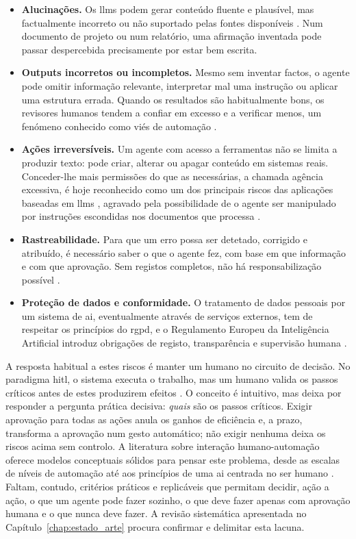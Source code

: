 \begin{itemize}
  \item \textbf{Alucinações.} Os \glspl{llm} podem gerar conteúdo fluente e plausível, mas factualmente incorreto ou não suportado pelas fontes disponíveis \parencite{ji2023survey,huang2025survey}. Num documento de projeto ou num relatório, uma afirmação inventada pode passar despercebida precisamente por estar bem escrita.
  \item \textbf{Outputs incorretos ou incompletos.} Mesmo sem inventar factos, o agente pode omitir informação relevante, interpretar mal uma instrução ou aplicar uma estrutura errada. Quando os resultados são habitualmente bons, os revisores humanos tendem a confiar em excesso e a verificar menos, um fenómeno conhecido como viés de automação \parencite{parasuraman2010complacency,goddard2012automation}.
  \item \textbf{Ações irreversíveis.} Um agente com acesso a ferramentas não se limita a produzir texto: pode criar, alterar ou apagar conteúdo em sistemas reais. Conceder-lhe mais permissões do que as necessárias, a chamada agência excessiva, é hoje reconhecido como um dos principais riscos das aplicações baseadas em \glspl{llm} \parencite{owasp2025top10}, agravado pela possibilidade de o agente ser manipulado por instruções escondidas nos documentos que processa \parencite{greshake2023not}.
  \item \textbf{Rastreabilidade.} Para que um erro possa ser detetado, corrigido e atribuído, é necessário saber o que o agente fez, com base em que informação e com que aprovação. Sem registos completos, não há responsabilização possível \parencite{raji2020closing}.
  \item \textbf{Proteção de dados e conformidade.} O tratamento de dados pessoais por um sistema de \gls{ai}, eventualmente através de serviços externos, tem de respeitar os princípios do \gls{rgpd}, e o Regulamento Europeu da Inteligência Artificial introduz obrigações de registo, transparência e supervisão humana \parencite{rgpd2016,aiact2024}.
\end{itemize}

A resposta habitual a estes riscos é manter um humano no circuito de decisão. No paradigma \gls{hitl}, o sistema executa o trabalho, mas um humano valida os passos críticos antes de estes produzirem efeitos \parencite{mosqueira2023human,hleg2019ethics}. O conceito é intuitivo, mas deixa por responder a pergunta prática decisiva: \emph{quais} são os passos críticos. Exigir aprovação para todas as ações anula os ganhos de eficiência e, a prazo, transforma a aprovação num gesto automático; não exigir nenhuma deixa os riscos acima sem controlo. A literatura sobre interação humano-automação oferece modelos conceptuais sólidos para pensar este problema, desde as escalas de níveis de automação \parencite{sheridan1978human,parasuraman2000model} até aos princípios de uma \gls{ai} centrada no ser humano \parencite{shneiderman2020human}. Faltam, contudo, critérios práticos e replicáveis que permitam decidir, ação a ação, o que um agente pode fazer sozinho, o que deve fazer apenas com aprovação humana e o que nunca deve fazer. A revisão sistemática apresentada no Capítulo~\ref{chap:estado_arte} procura confirmar e delimitar esta lacuna.

